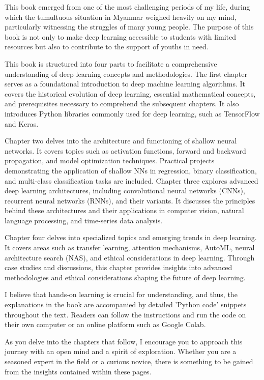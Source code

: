 This book emerged from one of the most challenging periods of my life, during which the tumultuous situation in Myanmar weighed heavily on my mind, particularly witnessing the struggles of many young people. The purpose of this book is not only to make deep learning accessible to students with limited resources but also to contribute to the support of youths in need. 

This book is structured into four parts to facilitate a comprehensive understanding of deep learning concepts and methodologies. The first chapter serves as a foundational introduction to deep machine learning algorithms. It covers the historical evolution of deep learning, essential mathematical concepts, and prerequisites necessary to comprehend the subsequent chapters.  It also introduces Python libraries commonly used for deep learning, such as TensorFlow and Keras.

Chapter two delves into the architecture and functioning of shallow neural networks. It covers topics such as activation functions, forward and backward propagation, and model optimization techniques. Practical projects demonstrating the application of shallow NNs in regression, binary classification, and multi-class classification tasks are included.  Chapter three explores advanced deep learning architectures, including convolutional neural networks (CNNs), recurrent neural networks (RNNs), and their variants. It discusses the principles behind these architectures and their applications in computer vision, natural language processing, and time-series data analysis.

Chapter four delves into specialized topics and emerging trends in deep learning. It covers areas such as transfer learning, attention mechanisms, AutoML, neural architecture search (NAS), and ethical considerations in deep learning. Through case studies and discussions, this chapter provides insights into advanced methodologies and ethical considerations shaping the future of deep learning.

I believe that hands-on learning is crucial for understanding, and thus, the explanations in the book are accompanied by detailed 'Python code' snippets throughout the text. Readers can follow the instructions and run the code on their own computer or an online platform such as Google Colab.

As you delve into the chapters that follow, I encourage you to approach this journey with an open mind and a spirit of exploration. Whether you are a seasoned expert in the field or a curious novice, there is something to be gained from the insights contained within these pages.

